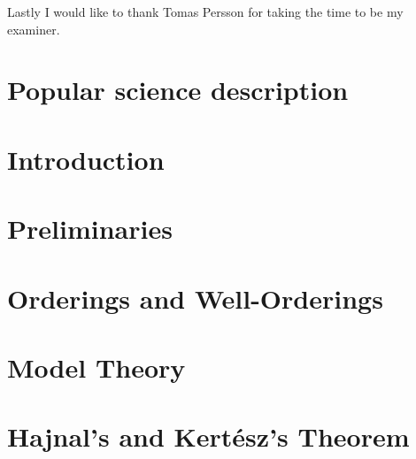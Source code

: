 \documentclass[a4paper,12pt]{memoir}
\numberwithin{equation}{section} %
\theoremstyle{plain} %
\theoremstyle{definition} %
\theoremstyle{remark} %
\begin{document}
Lastly I would like to thank Tomas Persson for taking the time to be my examiner.

\chapter*{Popular science description}




\cleardoublepage

\tableofcontents*



\chapter*{Introduction}




\mainmatter %

\chapter{Preliminaries}\label{preliminaries}


\chapter{Orderings and Well-Orderings}\label{orderings}


\chapter{Model Theory}\label{model-theory}


\chapter{Hajnal's and Kertész's Theorem}




\appendix %


\backmatter


%
%
\printbibliography



\end{document}

